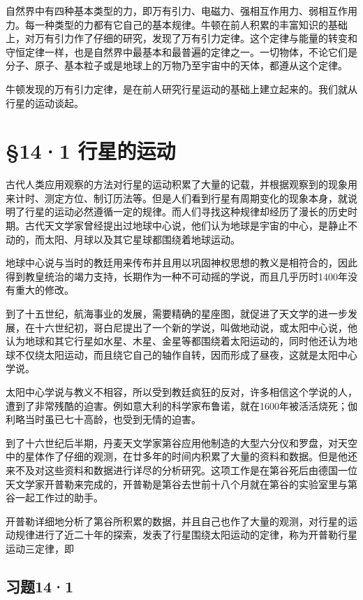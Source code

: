 自然界中有四种基本类型的力，即万有引力、电磁力、强相互作用力、弱相互作用力。每一种类型的力都有它自己的基本规律。牛顿在前人积累的丰富知识的基础上，对万有引力作了仔细的研究，发现了万有引力定律。这个定律与能量的转变和守恒定律一样，也是自然界中最基本和最普遍的定律之一。一切物体，不论它们是分子、原子、基本粒子或是地球上的万物乃至宇宙中的天体，都遵从这个定律。

牛顿发现的万有引力定律，是在前人研究行星运动的基础上建立起来的。我们就从行星的运动谈起。

\section{§14·1 行星的运动}\label{ux884cux661fux7684ux8fd0ux52a8}

古代人类应用观察的方法对行星的运动积累了大量的记载，并根据观察到的现象用来计时、测定方位、制订历法等。但是人们看到行星有周期变化的现象本身，就说明了行星的运动必然遵循一定的规律。而人们寻找这种规律却经历了漫长的历史时期。古代天文学家曾经提出过地球中心说，他们认为地球是宇宙的中心，是静止不动的，而太阳、月球以及其它星球都围绕着地球运动。

地球中心说与当时的教廷用来传布并且用以巩固神权思想的教义是相符合的，因此得到教皇统治的竭力支持，长期作为一种不可动摇的学说，而且几乎历时1400年没有重大的修改。

到了十五世纪，航海事业的发展，需要精确的星座图，就促进了天文学的进一步发展，在十六世纪初，哥白尼提出了一个新的学说，叫做地动说，或太阳中心说，他认为地球和其它行星如水星、木星、金星等都围绕着太阳运动的，同时他还认为地球不仅绕太阳运动，而且绕它自己的轴作自转，因而形成了昼夜，这就是太阳中心学说。

太阳中心学说与教义不相容，所以受到教廷疯狂的反对，许多相信这个学说的人，遭到了非常残酷的迫害。例如意大利的科学家布鲁诺，就在1600年被活活烧死；伽利略当时虽已七十高龄，也受到无情的迫害。

到了十六世纪后半期，丹麦天文学家第谷应用他制造的大型六分仪和罗盘，对天空中的星体作了仔细的观测，在廿多年的时间内积累了大量的资料和数据。但是他还来不及对这些资料和数据进行详尽的分析研究。这项工作是在第谷死后由德国一位天文学家开普勒来完成的，开普勒是第谷去世前十八个月就在第谷的实验室里与第谷一起工作过的助手。

开普勒详细地分析了第谷所积累的数据，并且自己也作了大量的观测，对行星的运动规律进行了近二十年的探索，发表了行星围绕太阳运动的定律，称为开普勒行星运动三定律，即

\subsection{习题14·1}\label{ux4e60ux9898141}

